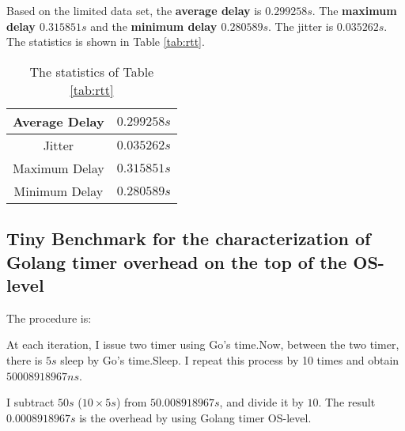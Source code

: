 \documentclass[a4paper,12pt]{article}
\theoremstyle{mytheor}
\begin{document}
Based on the limited data set, 
the {\bf average delay} is {\bf $0.299258s$}. 
The {\bf  maximum delay   $0.315851s$} and the {\bf minimum delay   $0.280589s$}.
The jitter is $0.035262s$.
The statistics is shown in Table \ref{tab:rtt}. 		

\begin{table}[h]
	\centering
	\small{
		\caption{The statistics of Table \ref{tab:rtt}} \vspace{0.1in}
		\begin{tabular}{|c|r|}  \hline 
			Average Delay & 	$0.299258s$ \\ \hline 
			Jitter & $0.035262s$ \\ \hline 
			Maximum Delay &  $0.315851s$  \\ \hline 
			Minimum Delay &  $0.280589s$ \\ \hline 
		\end{tabular}
		\label{tab:sum}
	}
\end{table}		


\vspace{0.1in}
\subsection{Tiny Benchmark for the characterization  of Golang timer overhead on the top of the OS-level} 
\label{timer}

The procedure is: 

 At each iteration, I issue two timer using Go's time.Now, between the two timer, there is $5s$ sleep by Go's time.Sleep. I repeat this process by 10 times and obtain $50008918967ns$. 

I subtract $50s$ ($10 \times 5s$) from $50.008918967s$, and divide it by $10$. The result $0.0008918967s$ is the overhead by using Golang timer OS-level. 


\vspace{0.1in}
\end{document}
